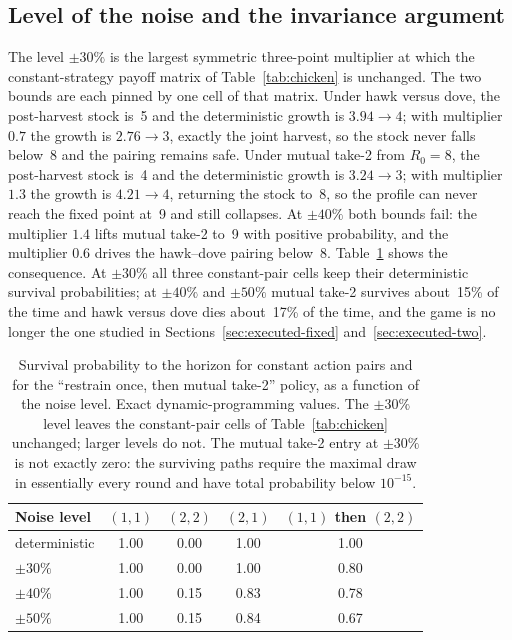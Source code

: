 \subsection{Level of the noise and the invariance argument}

The level \(\pm 30\%\) is the largest symmetric three-point multiplier at
which the constant-strategy payoff matrix of Table~\ref{tab:chicken} is
unchanged.
The two bounds are each pinned by one cell of that matrix.
Under hawk versus dove, the post-harvest stock is~5 and the deterministic
growth is \(3.94 \to 4\); with multiplier \(0.7\) the growth is
\(2.76 \to 3\), exactly the joint harvest, so the stock never falls below~8
and the pairing remains safe.
Under mutual take-2 from \(R_0 = 8\), the post-harvest stock is~4 and the
deterministic growth is \(3.24 \to 3\); with multiplier \(1.3\) the growth
is \(4.21 \to 4\), returning the stock to~8, so the profile can never
reach the fixed point at~9 and still collapses.
At \(\pm 40\%\) both bounds fail: the multiplier \(1.4\) lifts mutual take-2
to~9 with positive probability, and the multiplier \(0.6\) drives the
hawk--dove pairing below~8.
Table~\ref{tab:noise-level} shows the consequence.
At \(\pm 30\%\) all three constant-pair cells keep their deterministic
survival probabilities; at \(\pm 40\%\) and \(\pm 50\%\) mutual take-2
survives about~15\% of the time and hawk versus dove dies about~17\% of
the time, and the game is no longer the one studied in
Sections~\ref{sec:executed-fixed} and~\ref{sec:executed-two}.

\begin{table}[ht]
\centering
\caption{Survival probability to the horizon for constant action pairs
  and for the ``restrain once, then mutual take-2'' policy, as a function
  of the noise level.
  Exact dynamic-programming values.
  The \(\pm 30\%\) level leaves the constant-pair cells of
  Table~\ref{tab:chicken} unchanged; larger levels do not.
  The mutual take-2 entry at \(\pm 30\%\) is not exactly zero: the
  surviving paths require the maximal draw in essentially every round and
  have total probability below \(10^{-15}\).}
\label{tab:noise-level}
\begin{tabular}{lcccc}
\toprule
Noise level & \((1,1)\) & \((2,2)\) & \((2,1)\) & \((1,1)\) then \((2,2)\) \\
\midrule
deterministic & 1.00 & 0.00 & 1.00 & 1.00 \\
\(\pm 30\%\)  & 1.00 & 0.00 & 1.00 & 0.80 \\
\(\pm 40\%\)  & 1.00 & 0.15 & 0.83 & 0.78 \\
\(\pm 50\%\)  & 1.00 & 0.15 & 0.84 & 0.67 \\
\bottomrule
\end{tabular}
\end{table}

